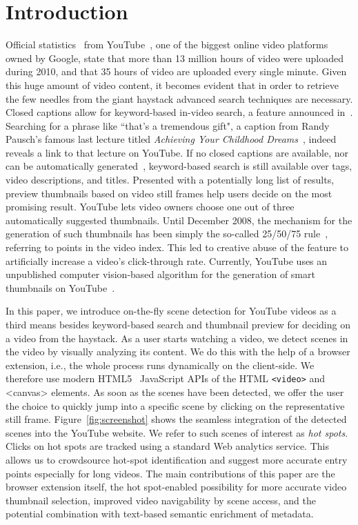 \documentclass[10pt,twocolumn,letterpaper]{article}
\begin{document}
\section{Introduction}
Official statistics~\cite{youtube:stats} from YouTube~\cite{youtube}, one of the biggest online video platforms owned by Google, state that more than 13 million hours of video were uploaded during 2010, and that 35 hours of video are uploaded every single minute. Given this huge amount of video content, it becomes evident that in order to retrieve the few needles from the giant haystack advanced search techniques are necessary. Closed captions allow for keyword-based in-video search, a feature announced in~\cite{googlevideo}. Searching for a phrase like ``that's a tremendous gift", a caption from Randy Pausch's famous last lecture titled \emph{Achieving Your Childhood Dreams}~\cite{pausch}, indeed reveals a link to that lecture on YouTube. If no closed captions are available, nor can be automatically generated~\cite{youtubecaptions}, keyword-based search is still available over tags, video descriptions, and titles. Presented with a potentially long list of results, preview thumbnails based on video still frames help users decide on the most promising result. YouTube lets video owners choose one out of three automatically suggested thumbnails. Until December 2008, the mechanism for the generation of such thumbnails has been simply the so-called 25/50/75 rule~\cite{youtuberule}, referring to points in the video index. This led to creative abuse of the feature to artificially increase a video's click-through rate. Currently, YouTube uses an unpublished computer vision-based algorithm for the generation of smart thumbnails on YouTube~\cite{googleresearch}.

In this paper, we introduce on-the-fly scene detection for YouTube videos as a third means besides keyword-based search and thumbnail preview for deciding on a video from the haystack. As a user starts watching a video, we detect scenes in the video by visually analyzing its content. We do this with the help of a browser extension, i.e., the whole process runs dynamically on the client-side. We therefore use modern HTML5~\cite{w3c_html5} JavaScript APIs of the HTML \texttt{<video>} and {<canvas>} elements. As soon as the scenes have been detected, we offer the user the choice to quickly jump into a specific scene by clicking on the representative still frame. Figure~\ref{fig:screenshot} shows the seamless integration of the detected scenes into the YouTube website. We refer to such scenes of interest as \emph{hot spots}. Clicks on hot spots are tracked using a standard Web analytics service. This allows us to crowdsource hot-spot identification and suggest more accurate entry points especially for long videos. The main contributions of this paper are the browser extension itself, the hot spot-enabled possibility for more accurate video thumbnail selection, improved video navigability by scene access, and the potential combination with text-based semantic enrichment of metadata.
\end{document}

